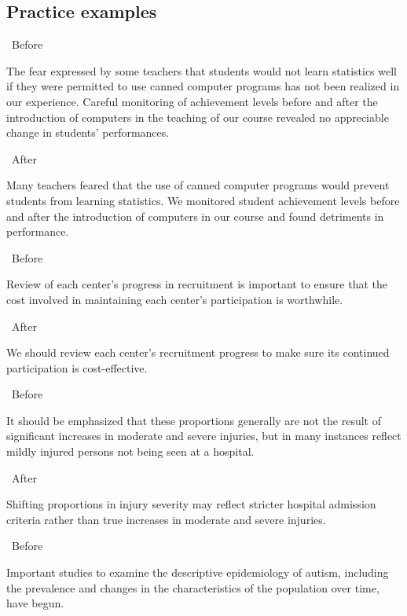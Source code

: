 \documentclass[a4paper, 12pt]{article}
\begin{document}
\newpage\subsection{Practice examples}

\par\textbullet\ Before
\par The fear expressed by some teachers that students would not learn statistics well if they were permitted to use canned computer programs has not been realized in our experience. Careful monitoring of achievement levels before and after the introduction of computers in the teaching of our course revealed no appreciable change in students’ performances.

\par\textbullet\ After
\par Many teachers feared that the use of canned computer programs would prevent students from learning statistics. We monitored student achievement levels before and after the introduction of computers in our course and found detriments in performance.

\par\textbullet\ Before
\par Review of each center’s progress in recruitment is important to ensure that the cost involved in maintaining each center’s participation is worthwhile.

\par\textbullet\ After
\par We should review each center's recruitment progress to make sure its continued participation is cost-effective.

\par\textbullet\ Before
\par It should be emphasized that these proportions generally are not the result of significant increases in moderate and severe injuries, but in many instances reflect mildly injured persons not being seen at a hospital.

\par\textbullet\ After
\par Shifting proportions in injury severity may reflect stricter hospital admission criteria rather than true increases in moderate and severe injuries.

\par\textbullet\ Before
\par Important studies to examine the descriptive epidemiology of autism, including the prevalence and changes in the characteristics of the population over time, have begun.
\end{document}
